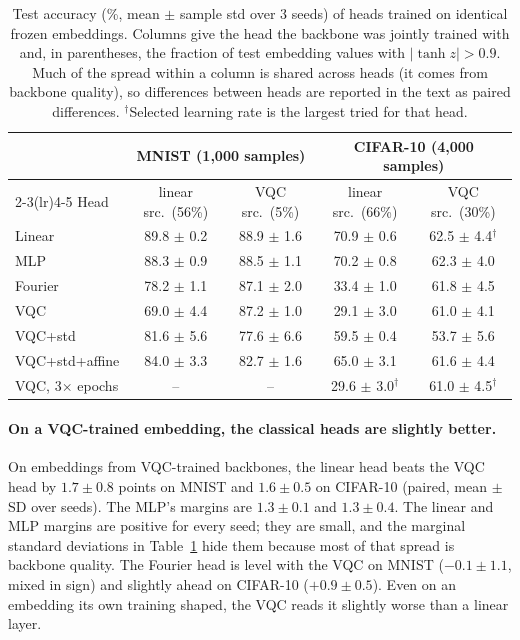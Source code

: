 \documentclass[10pt]{article}
\begin{document}
\begin{table}[t]
\centering
\caption{Test accuracy (\%, mean $\pm$ sample std over 3 seeds) of heads
trained on identical frozen embeddings. Columns give the head the backbone was
jointly trained with and, in parentheses, the fraction of test embedding values
with $|\tanh z| > 0.9$. Much of the spread within a column is shared across
heads (it comes from backbone quality), so differences between heads are
reported in the text as paired differences. $^\dagger$Selected learning rate
is the largest tried for that head.}
\label{tab:frozen}
\small
\begin{tabular}{lcccc}
\toprule
& \multicolumn{2}{c}{MNIST (1{,}000 samples)} & \multicolumn{2}{c}{CIFAR-10 (4{,}000 samples)} \\
\cmidrule(lr){2-3}\cmidrule(lr){4-5}
Head & linear src.\ (56\%) & VQC src.\ (5\%) & linear src.\ (66\%) & VQC src.\ (30\%) \\
\midrule
Linear          & 89.8 $\pm$ 0.2 & 88.9 $\pm$ 1.6 & 70.9 $\pm$ 0.6 & 62.5 $\pm$ 4.4$^\dagger$ \\
MLP             & 88.3 $\pm$ 0.9 & 88.5 $\pm$ 1.1 & 70.2 $\pm$ 0.8 & 62.3 $\pm$ 4.0 \\
Fourier         & 78.2 $\pm$ 1.1 & 87.1 $\pm$ 2.0 & 33.4 $\pm$ 1.0 & 61.8 $\pm$ 4.5 \\
VQC             & 69.0 $\pm$ 4.4 & 87.2 $\pm$ 1.0 & 29.1 $\pm$ 3.0 & 61.0 $\pm$ 4.1 \\
VQC+std         & 81.6 $\pm$ 5.6 & 77.6 $\pm$ 6.6 & 59.5 $\pm$ 0.4 & 53.7 $\pm$ 5.6 \\
VQC+std+affine  & 84.0 $\pm$ 3.3 & 82.7 $\pm$ 1.6 & 65.0 $\pm$ 3.1 & 61.6 $\pm$ 4.4 \\
VQC, 3$\times$ epochs & -- & -- & 29.6 $\pm$ 3.0$^\dagger$ & 61.0 $\pm$ 4.5$^\dagger$ \\
\bottomrule
\end{tabular}
\end{table}

\paragraph{On a VQC-trained embedding, the classical heads are slightly better.}
On embeddings from VQC-trained backbones, the linear head beats the VQC head by
$1.7 \pm 0.8$ points on MNIST and $1.6 \pm 0.5$ on CIFAR-10 (paired, mean
$\pm$ SD over seeds). The MLP's margins are
$1.3 \pm 0.1$ and $1.3 \pm 0.4$. The linear and MLP margins are positive for every seed;
they are small, and the marginal standard deviations in Table~\ref{tab:frozen}
hide them because most of that spread is backbone quality. The Fourier head is
level with the VQC on MNIST ($-0.1 \pm 1.1$, mixed in sign) and slightly
ahead on CIFAR-10 ($+0.9 \pm 0.5$). Even on an embedding its
own training shaped, the VQC reads it slightly worse than a linear layer.
\end{document}
